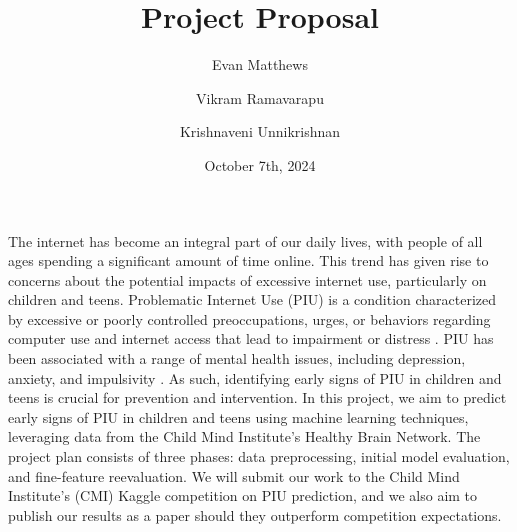 \documentclass[11pt]{extarticle}
\title{Project Proposal}
\author[1]{Evan Matthews}
\author[1]{Vikram Ramavarapu}
\author[1]{Krishnaveni Unnikrishnan}
\affil[1]{CS 412 Group G6}
\date{October 7th, 2024}
\begin{document}
\maketitle

\pagebreak





The internet has become an integral part of our daily lives, with people of all ages spending a significant amount of time online. 
This trend has given rise to concerns about the potential impacts of excessive internet use, particularly on children and teens.
Problematic Internet Use (PIU) is a condition characterized by excessive or poorly controlled preoccupations, urges, or behaviors regarding computer use and internet access that lead to impairment or distress \cite{Pettorruso2020-qt}. 
PIU has been associated with a range of mental health issues, including depression, anxiety, and impulsivity \cite{Cash2012-rb}.
As such, identifying early signs of PIU in children and teens is crucial for prevention and intervention.
In this project, we aim to predict early signs of PIU in children and teens using machine learning techniques, leveraging data from the Child Mind Institute's Healthy Brain Network.
The project plan consists of three phases: data preprocessing, initial model evaluation, and fine-feature reevaluation.
We will submit our work to the Child Mind Institute's (CMI) Kaggle competition on PIU prediction, and we also aim to publish our results as a paper should they outperform competition expectations.

\end{document}

